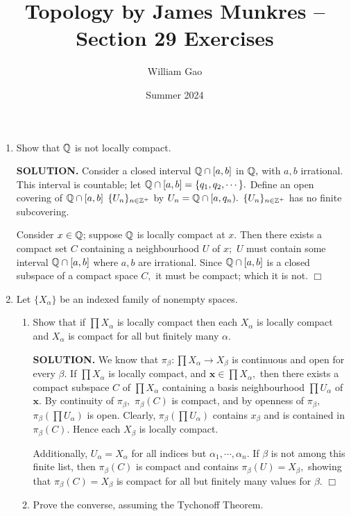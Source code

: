\documentclass{article}
\title{Topology by James Munkres -- Section 29 Exercises}
\author{William Gao}
\date{Summer 2024}
\begin{document}
\maketitle

\begin{enumerate}
    \item Show that $\mathbb{Q}$ is not locally compact.

    {\bf SOLUTION.} Consider a closed interval $\mathbb{Q} \cap [a, b]$ in $\mathbb{Q},$ with $a, b$ irrational. This interval is countable; let $\mathbb{Q} \cap [a, b] = \{q_1, q_2, \cdots\}.$ Define an open covering of $\mathbb{Q} \cap [a, b]$ $\{U_n\}_{n \in \mathbb{Z}^+}$ by $U_n = \mathbb{Q} \cap [a, q_n).$ $\{U_n\}_{n \in \mathbb{Z}^+}$ has no finite subcovering.
    
    Consider $x \in \mathbb{Q}$; suppose $\mathbb{Q}$ is locally compact at $x.$ Then there exists a compact set $C$ containing a neighbourhood $U$ of $x;$ $U$ must contain some interval $\mathbb{Q} \cap [a, b]$ where $a, b$ are irrational. Since $\mathbb{Q} \cap [a, b]$ is a closed subspace of a compact space $C,$ it must be compact; which it is not. $\Box$

    \item Let $\{X_\alpha\}$ be an indexed family of nonempty spaces.
    \begin{enumerate}
        \item Show that if $\prod X_\alpha$ is locally compact then each $X_\alpha$ is locally compact and $X_\alpha$ is compact for all but finitely many $\alpha.$

        {\bf SOLUTION.} We know that $\pi_\beta: \prod X_\alpha \rightarrow X_\beta$ is continuous and open for every $\beta.$ If $\prod X_\alpha$ is locally compact, and $\mathbf{x} \in \prod X_\alpha,$ then there exists a compact subspace $C$ of $\prod X_\alpha$ containing a basis neighbourhood $\prod U_\alpha$ of $\mathbf{x}.$ By continuity of $\pi_\beta,$ $\pi_\beta(C)$ is compact, and by openness of $\pi_\beta,$ $\pi_\beta(\prod U_\alpha)$ is open. Clearly, $\pi_\beta(\prod U_\alpha)$ contains $x_\beta$ and is contained in $\pi_\beta(C).$ Hence each $X_\beta$ is locally compact.

        Additionally, $U_\alpha = X_\alpha$ for all indices but $\alpha_1, \cdots, \alpha_n.$ If $\beta$ is not among this finite list, then $\pi_\beta(C)$ is compact and contains $\pi_\beta(U) = X_\beta,$ showing that $\pi_\beta(C) = X_\beta$ is compact for all but finitely many values for $\beta$. $\Box$

        \item Prove the converse, assuming the Tychonoff Theorem.


\end{enumerate}
\end{enumerate}
\end{document}
